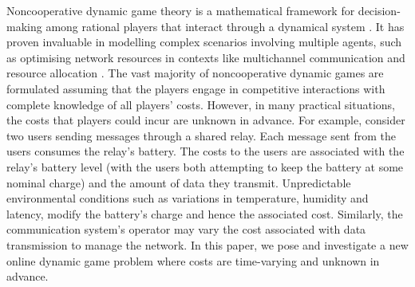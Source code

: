 \documentclass[letterpaper, 10 pt, conference]{ieeeconf}  %
\begin{document}
Noncooperative dynamic game theory is a mathematical framework for decision-making among rational players that interact through a dynamical system  \cite{basar_dynamic_1998,engwerda_lq_2005}. It has proven invaluable in modelling complex scenarios involving multiple agents, such as optimising network resources in contexts like multichannel communication and resource allocation \cite{prasad_structure_2023,zazo_dynamic_2016}.
The vast majority of noncooperative dynamic games are formulated assuming that the players engage in competitive interactions with complete knowledge of all players' costs.
However, in many practical situations, the costs that players could incur are unknown in advance.
For example, consider two users sending messages through a shared relay. Each message sent from the users consumes the relay's battery. 
The costs to the users are associated with the relay's battery level (with the users both attempting to keep the battery at some nominal charge) and the amount of data they transmit. 
Unpredictable environmental conditions such as variations in temperature, humidity and latency, modify the battery's charge and hence the associated cost.
Similarly, the communication system's operator may vary the cost associated with data transmission to manage the network.
In this paper, we pose and investigate a new online dynamic game problem where costs are time-varying and unknown in advance.





\end{document}
